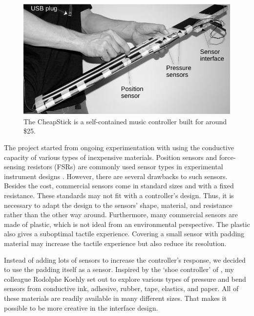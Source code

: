 \begin{figure}[tbp]
\begin{center}
\centerline{\includegraphics[width=1\columnwidth]{figures/65-cheapstick-crop.pdf}}
\caption{The CheapStick is a self-contained music controller built for around \${25}.}
\label{fig:cheapstick}
\end{center}
\end{figure}

The project started from ongoing experimentation with using the conductive capacity of various types of inexpensive materials. Position sensors and force-sensing resistors (FSRs) are commonly used sensor types in experimental instrument designs \citep{kronland-martinet_evaluation_2006}. However, there are several drawbacks to such sensors. Besides the cost, commercial sensors come in standard sizes and with a fixed resistance. These standards may not fit with a controller's design. Thus, it is necessary to adapt the design to the sensors' shape, material, and resistance rather than the other way around. Furthermore, many commercial sensors are made of plastic, which is not ideal from an environmental perspective. The plastic also gives a suboptimal tactile experience. Covering a small sensor with padding material may increase the tactile experience but also reduce its resolution.

Instead of adding lots of sensors to increase the controller's response, we decided to use the padding itself as a sensor. Inspired by the `shoe controller' of \citet{paradiso_magic_1997}, my colleague Rodolphe Koehly set out to explore various types of pressure and bend sensors from conductive ink, adhesive, rubber, tape, elastics, and paper. All of these materials are readily available in many different sizes. That makes it possible to be more creative in the interface design.

